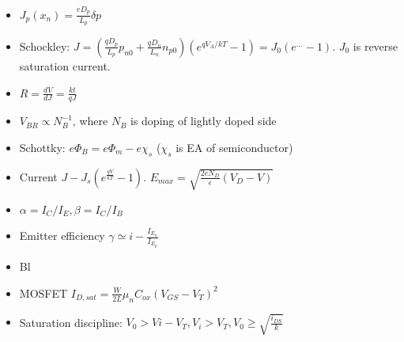 \documentclass[10pt]{article}
\begin{document}
\begin{itemize}
\item $J_p(x_n)=\frac{eD_p}{L_p}\delta p$
\item Schockley: $J=\left(\frac{qD_p}{L_p}p_{n0}+\frac{qD_n}{L_n}n_{p0}\right)(e^{qV_A/kT}-1)=J_0(e^{...}-1)$. $J_0$ is reverse saturation current.
\item $R=\frac{dV}{dJ}=\frac{kt}{qJ}$
\item $V_{BR}\propto N_B^{-1}$, where $N_B$ is doping of lightly doped side
\item Schottky: $e\Phi_B=e\Phi_m-e\chi_s$ ($\chi_s$ is EA of semiconductor)
\item Current $J-J_s\left(e^{\frac{qV}{kT}}-1\right)$. $E_{max}=\sqrt{\frac{2eN_D}{\epsilon}(V_D-V)}$
\item $\alpha=I_C/I_E , \beta= I_C/I_B$
\item Emitter efficiency $\gamma \simeq i-\frac{I_{E_n}}{I_{E_p}}$
\item Bl
\item MOSFET $I_{D,sat}=\frac{W}{2L}\mu_nC_{ox}(V_{GS}-V_T)^2$
\item Saturation discipline: $V_0>Vi-V_T,V_i>V_T,V_0\geq \sqrt{\frac{i_{DS}}{k}}$
\end{itemize}
\end{document}

